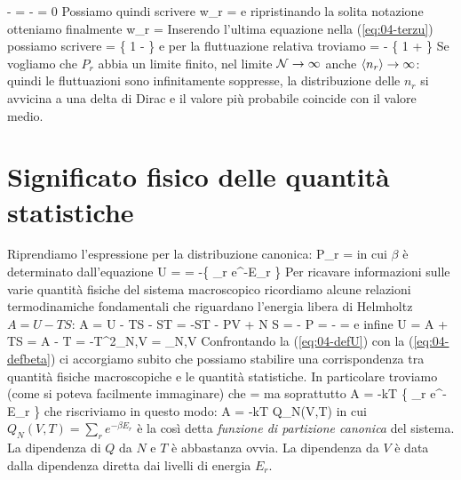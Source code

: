 \be
{} -  =
 -  = 0
\ee
Possiamo quindi scrivere
\be
w_r =  
\ee
e ripristinando la solita notazione otteniamo finalmente
\be
w_r =  
\ee
Inserendo l'ultima equazione nella (\ref{eq:04-terzu}) possiamo scrivere
\be
{} = 
\left\{
1 -  
\right\}
\ee
e per la fluttuazione relativa troviamo
\be
{} =  - 
\left\{
1 + 
\right\}
\ee
Se vogliamo che $P_r$ abbia un limite finito, nel limite ${\mathcal N}\to\infty$ anche $\langle n_r\rangle\to\infty$: quindi le fluttuazioni sono infinitamente soppresse, la distribuzione delle $n_r$ si avvicina a una delta di Dirac e il valore più probabile coincide con il valore medio.

\section{Significato fisico delle quantità statistiche}
\label{sec:04-significato}

Riprendiamo l'espressione per la distribuzione canonica:
\be
\label{eq:04-distcan}
P_r \equiv {} = 
\ee
in cui $\beta$ è determinato dall'equazione
\be
\label{eq:04-defbeta}
U =  = -\dpar{}{\beta}\ln\left\{ \sum_r e^{-\beta E_r} \right\}
\ee
Per ricavare informazioni sulle varie quantità fisiche del sistema macroscopico ricordiamo alcune relazioni termodinamiche fondamentali che riguardano l'energia libera di Helmholtz $A = U - TS$:
\be
\label{eq:04-dA}
\de A = \de U - T\de S - S\de T = -S\de T - P\de V + \mu\de N
\ee
\be
\label{eq:04-maxdA}
S   = - \quad
P   = - \quad
\mu =  
\ee
e infine
\be
\label{eq:04-defU}
U = A + TS = A - T = -T^2_{N,V}
= _{N,V}
\ee
Confrontando la (\ref{eq:04-defU}) con la (\ref{eq:04-defbeta}) ci accorgiamo subito che possiamo stabilire una corrispondenza tra quantità fisiche macroscopiche e le quantità statistiche. In particolare troviamo (come si poteva facilmente immaginare) che
\be
\beta = 
\ee
ma soprattutto
\be
A = -kT \ln\left\{ \sum_r e^{-\beta E_r} \right\}
\ee
che riscriviamo in questo modo:
\be
\label{eq:04-introQ}
A = -kT \ln Q_N(V,T)
\ee
in cui $Q_N(V,T) = \sum_r e^{-\beta E_r}$ è la così detta {\em funzione di partizione canonica} del sistema. La dipendenza di $Q$ da $N$ e $T$ è abbastanza ovvia. La dipendenza da $V$ è data dalla dipendenza diretta dai livelli di energia $E_r$.


